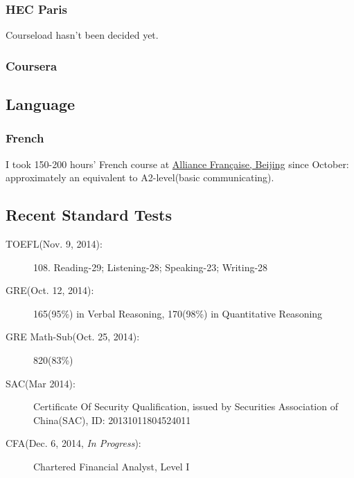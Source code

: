 \documentclass{article}
\begin{document}
\subsubsection{HEC Paris}
Courseload hasn't been decided yet.
\subsubsection{Coursera}

\subsection{Language}
\subsubsection{French}
I took 150-200 hours' French course at \href{http://www.alliancefr.org/}{Alliance Française, Beijing} since October: approximately an equivalent to A2-level(basic communicating).

\subsection{Recent Standard Tests}
\begin{description}
\item[TOEFL(Nov. 9, 2014):] 108. Reading-29; Listening-28; Speaking-23; Writing-28
\item[GRE(Oct. 12, 2014):] 165(95\%) in Verbal Reasoning, 170(98\%) in Quantitative Reasoning
\item[GRE Math-Sub(Oct. 25, 2014):] 820(83\%)
\item[SAC(Mar 2014):] Certificate Of Security Qualification, issued by Securities Association of China(SAC), ID: 20131011804524011
\item[CFA(Dec. 6, 2014, {\it In Progress}):] Chartered Financial Analyst, Level I 
\end{description}
% 
\end{document}
